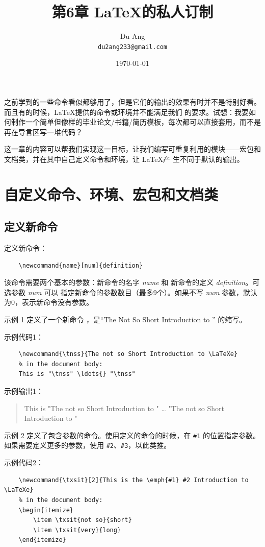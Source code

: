 \documentclass[UTF8]{ctexart}
\title{\heiti 第6章 \quad \LaTeX 的私人订制}
\author{\kaishu Du Ang \\ \texttt{du2ang233@gmail.com} }
\date{\today}
\begin{document}
\maketitle

\tableofcontents

\newpage

之前学到的一些命令看似都够用了，但是它们的输出的效果有时并不是特别好看。而且有的时候，\LaTeX 提供的命令或环境并不能满足我们
的要求。试想：我要如何制作一个简单但像样的毕业论文/书籍/简历模板，每次都可以直接套用，而不是再在导言区写一堆代码？

这一章的内容可以帮我们实现这一目标，让我们编写可重复利用的模块——宏包和文档类，并在其中自己定义命令和环境，让 \LaTeX 产
生不同于默认的输出。

\section{自定义命令、环境、宏包和文档类}
\subsection{定义新命令}
定义新命令：
\begin{verbatim}
    \newcommand{name}[num]{definition}
\end{verbatim}

该命令需要两个基本的参数：新命令的名字 \emph{name} 和 新命令的定义 \emph{definition}。可选参数 \emph{num} 可以
指定新命令的参数数目（最多9个）。如果不写 \emph{num} 参数，默认为0，表示新命令没有参数。

示例 1 定义了一个新命令 \texttt{\tnss}，是“The Not So Short Introduction to \LaTeXe” 的缩写。

示例代码1：
\begin{verbatim}
    \newcommand{\tnss}{The not so Short Introduction to \LaTeXe}
    % in the document body:
    This is "\tnss" \ldots{} "\tnss"
\end{verbatim}

示例输出1：
\begin{quote}
    \newcommand{\tnss}{The not so Short Introduction to \LaTeXe}
    This is "\tnss" \ldots{} "\tnss"
\end{quote}

示例 2 定义了包含参数的命令。使用定义的命令的时候，在 \texttt{\#1} 的位置指定参数。如果需要定义更多的参数，使用
\texttt{\#2}、\texttt{\#3}，以此类推。

示例代码2：
\begin{verbatim}
    \newcommand{\txsit}[2]{This is the \emph{#1} #2 Introduction to \LaTeXe}
    % in the document body:
    \begin{itemize}
        \item \txsit{not so}{short}
        \item \txsit{very}{long}
    \end{itemize}
\end{verbatim}
\end{document}
